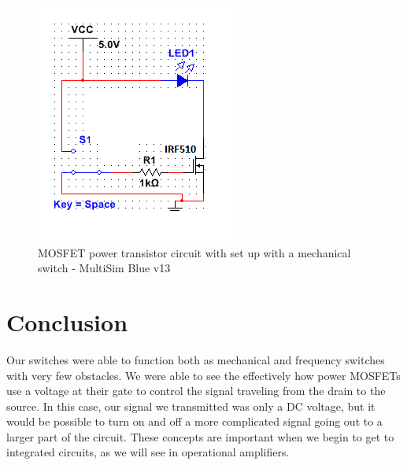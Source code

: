 \documentclass[a4paper]{article}
\begin{document}
\begin{figure}
\centering
\includegraphics[width=.5\textwidth]{Circuit_two.png}
\caption{\label{fig:Circuit_two}MOSFET power transistor circuit with set up with a mechanical switch - MultiSim Blue v13}
\end{figure}

\section{Conclusion}

Our switches were able to function both as mechanical and frequency switches with  very few obstacles.  We were able to see the effectively how power MOSFETs use a voltage at their gate to control the signal traveling from the drain to the source.  In this case, our signal we transmitted was only a DC voltage, but it would be possible to turn on and off a more complicated signal going out to a larger part of the circuit.  These concepts are important when we begin to get to integrated circuits, as we will see in operational amplifiers.
\end{document}
